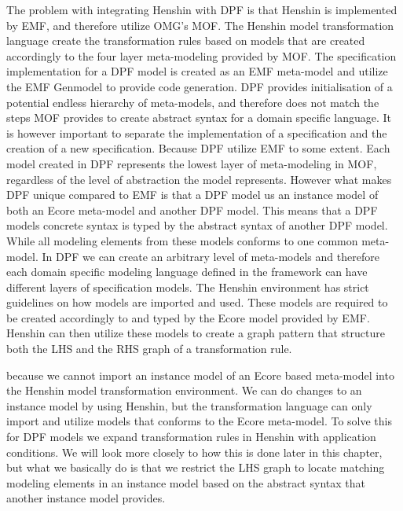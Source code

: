 The problem with integrating Henshin with DPF is that Henshin is implemented by
EMF, and therefore utilize OMG's MOF. The Henshin model transformation
language create the transformation rules based on models that are created
accordingly to the four layer meta-modeling provided by MOF. The
specification implementation for a DPF model is created as an EMF meta-model 
and utilize the EMF Genmodel to provide code generation. DPF provides
initialisation of a potential endless hierarchy of meta-models, and therefore
does not match the steps MOF provides to create abstract syntax for a domain
specific language. It is however important to separate the implementation of a
specification and the creation of a new specification. Because DPF utilize EMF
to some extent. Each model created in DPF represents the lowest layer of
meta-modeling in MOF, regardless of the level of abstraction the model
represents. However what makes DPF unique compared to EMF is that a DPF model us
an instance model of both an Ecore meta-model and another DPF model. This means
that a DPF models concrete syntax is typed by the abstract syntax of another DPF
model. While all modeling elements from these models conforms to one common
meta-model. In DPF we can create an arbitrary level of meta-models and therefore
each domain specific modeling language defined in the framework can have
different layers of specification models. The Henshin environment has strict
guidelines on how models are imported and used. These models are required to be
created accordingly to and typed by the Ecore model provided by EMF. Henshin
can then utilize these models to create a graph pattern that structure both the
LHS and the RHS graph of a transformation rule.

 because we cannot import an instance model of
an Ecore based meta-model into the Henshin model transformation environment. We
can do changes to an instance model by using Henshin, but the transformation
language can only import and utilize models that conforms to the Ecore
meta-model. To solve this for DPF models we expand transformation rules in
Henshin with application conditions. We will look more closely to how this is
done later in this chapter, but what we basically do is that we restrict the
LHS graph to locate matching modeling elements in an instance model based on
the abstract syntax that another instance model provides.

